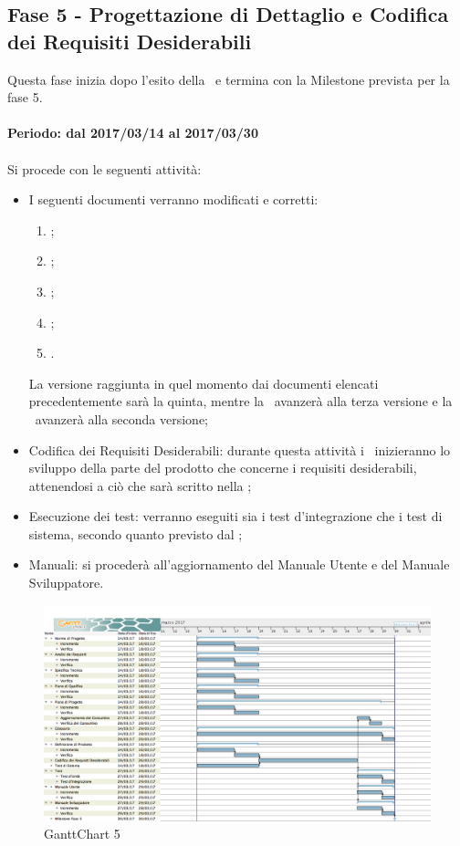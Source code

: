 \documentclass[../PianoDiProgetto.tex]{subfiles}
\begin{document}
	\newpage
	\subsection{Fase 5 - Progettazione di Dettaglio e Codifica dei Requisiti Desiderabili}
	Questa fase inizia dopo l'esito della \revisionediprogettazione\ e termina con la Milestone prevista per la fase 5.
	\\
	\\
	\textbf{Periodo: dal 2017/03/14 al 2017/03/30}
	\\
	\\
	Si procede con le seguenti attività:
	\begin{itemize}
		\item I seguenti documenti verranno modificati e corretti:
			\begin{enumerate}
				\item \normediprogetto;
				\item \analisideirequisiti;
				\item \pianodiqualifica;
				\item \pianodiprogetto;
				\item \glossario.
			\end{enumerate}
		La versione raggiunta in quel momento dai documenti elencati precedentemente sarà la quinta, mentre la \specificatecnica\ avanzerà alla terza versione e la \ avanzerà alla seconda versione;
		\item Codifica dei Requisiti Desiderabili: durante questa attività i \programmatori\ inizieranno lo sviluppo della parte del prodotto che concerne i requisiti desiderabili, attenendosi a ciò che sarà scritto nella ;
		\item Esecuzione dei test: verranno eseguiti sia i test d'integrazione che i test di sistema, secondo quanto previsto dal \pianodiqualifica;
		\item Manuali: si procederà all'aggiornamento del Manuale Utente e del Manuale Sviluppatore.
	\end{itemize}
	
	\newpage
	\begin{figure}[!h]
		\centering
		\includegraphics[width=\textwidth]{Pianificazione/Immagini/GanttChart05.png}
		\caption{GanttChart 5}
	\end{figure}	
	
\end{document}
